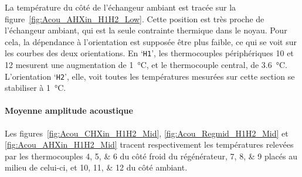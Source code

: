 %    

La température du côté de l'échangeur ambiant est tracée sur la figure~\ref{fig:Acou_AHXin_H1H2_Low}. Cette position est très proche de l'échangeur ambiant, qui est la seule contrainte thermique dans le noyau. Pour cela, la dépendance à l'orientation est supposée être plus faible, ce qui se voit sur les courbes des deux orientations. En `\texttt{H1}', les thermocouples périphériques 10 et 12 mesurent une augmentation de \qty{1}{\degreeCelsius}, et le thermocouple central, de \qty{3.6}{\degreeCelsius}. L'orientation `\texttt{H2}', elle, voit toutes les températures mesurées sur cette section se stabiliser à \qty{1}{\degreeCelsius}. 

%    

\paragraph*{Moyenne amplitude acoustique}
Les figures~\ref{fig:Acou_CHXin_H1H2_Mid}, \ref{fig:Acou_Regmid_H1H2_Mid} et \ref{fig:Acou_AHXin_H1H2_Mid} tracent respectivement les températures relevées par les thermocouples \numlist{4;5;6} du côté froid du régénérateur, \numlist{7;8;9} placés au milieu de celui-ci, et \numlist{10;11;12} du côté ambiant.

